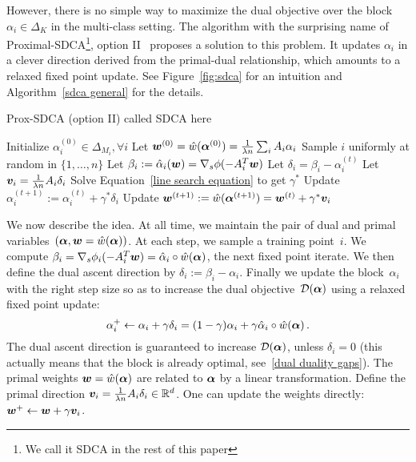 However, there is no simple way to maximize the dual objective over the block $\alpha_i \in \Delta_K$ in the multi-class setting.
The algorithm with the surprising name of Proximal-SDCA\footnote{We call it SDCA in the rest of this paper}, option II~\citep{shalev2016accelerated} proposes a solution to this problem.
It updates $\alpha_i$  in a clever direction derived from the primal-dual relationship, which amounts to a relaxed fixed point update.
See Figure~\ref{fig:sdca} for an intuition
and Algorithm~\ref{sdca general} for the details.

\begin{algorithm}[t]
	\caption{Prox-SDCA (option II) called SDCA here}%
	\label{sdca general}
	\begin{algorithmic}
		\STATE Initialize $\alpha_i^{(0)} \in \Delta_{M_i}, \forall i$
		\STATE Let $\boldsymbol{w}^{(0)} = \hat{w}(\bm{\alpha}^{(0)}) = \frac{1}{\lambda n} \sum_i A_i \alpha_i$
		\STATE Sample $i$ uniformly at random in $\{1,\ldots,n\}$
		\STATE Let $ \beta_i := \hat{\alpha}_i(\boldsymbol{w}) = \nabla_s \phi(-A_i^T \boldsymbol{w})$
		\STATE Let $\delta_i = \beta_i - \alpha_i^{(t)}$ 
		\STATE Let $\bm v_i = \frac{1}{\lambda n} A_i \delta_i $ 
		\STATE Solve Equation~\eqref{line search equation} to get $\gamma^*$ 
		\STATE Update $\alpha_i^{(t+1)} := \alpha_i^{(t)} + \gamma^* \delta_i$
		\STATE Update $\boldsymbol{w}^{(t+1)} := \hat{w}(\bm{\alpha}^{(t+1)}) = \boldsymbol{w}^{(t)} + \gamma^* \bm v_i $
		\ENDFOR
	\end{algorithmic}
\end{algorithm}


We now describe the idea.
At all time, we maintain the pair of dual and primal variables~$(\boldsymbol{\alpha}, \boldsymbol{w} = \hat w (\boldsymbol{\alpha}))$.
At each step, we sample a training point~$i$.
We compute $\beta_i = \nabla_s \phi_i(-A_i^T \boldsymbol{w}) = \hat \alpha_i \circ \hat w(\boldsymbol{\alpha})$,  the next fixed point iterate.
We then define the dual ascent direction by $\delta_i := \beta_i - \alpha_i$.
Finally we update the block~$\alpha_i$ with the right step size so as to increase the dual objective~${\mathcal D}(\boldsymbol{\alpha})$ using a relaxed fixed point update:
\begin{equation} \label{eq:dual_fixed_pt_update}
	\alpha_i^+ \leftarrow \alpha_i + \gamma \delta_i = (1-\gamma)\alpha_i + \gamma \hat \alpha_i \circ \hat w(\boldsymbol{\alpha}) \, .
\end{equation}
The dual ascent direction is guaranteed to increase ${\mathcal D}(\boldsymbol{\alpha})$, unless $\delta_i = 0$ (this actually means that the block is already optimal, see~\eqref{dual duality gaps}).
The primal weights $\boldsymbol{w} = \hat w (\boldsymbol{\alpha})$ are related to $\boldsymbol{\alpha}$ by a linear transformation.
Define the primal direction $\bm v_i = \frac{1}{\lambda n} A_i \delta_i \in \mathbb{R}^d$.
One can update the weights directly: $\boldsymbol{w}^+ \leftarrow \boldsymbol{w} + \gamma \bm v_i$.

